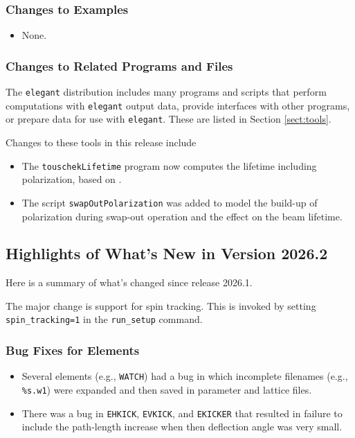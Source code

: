 \documentclass[11pt]{article}
\begin{document}
\subsubsection{Changes to Examples}

\begin{itemize}
\item None.
\end{itemize}

\subsubsection{Changes to Related Programs and Files}

The {\tt elegant} distribution includes many programs and scripts that perform computations with {\tt elegant}
output data, provide interfaces with other programs, or prepare data for use with {\tt elegant}. These
are listed in Section \ref{sect:tools}. 

Changes to these tools in this release include
\begin{itemize}
\item The \verb|touschekLifetime| program now computes the lifetime including polarization, based on
  \cite{PhysRevAccelBeams.27.124401}.
\item The script \verb|swapOutPolarization| was added to model the build-up of polarization during swap-out operation and
  the effect on the beam lifetime.
\end{itemize}

\subsection{Highlights of What's New in Version 2026.2}

Here is a summary of what's changed since release 2026.1.

The major change is support for spin tracking. This is invoked by setting \verb|spin_tracking=1| in the \verb|run_setup|
command.

\subsubsection{Bug Fixes for Elements}

\begin{itemize}
\item Several elements (e.g., \verb|WATCH|) had a bug in which incomplete filenames (e.g., \verb|%s.w1|) were expanded
  and then saved in parameter and lattice files.
\item There was a bug in \verb|EHKICK|, \verb|EVKICK|, and \verb|EKICKER| that resulted in failure to include the
  path-length increase when then deflection angle was very small.
\end{itemize}
\end{document}
